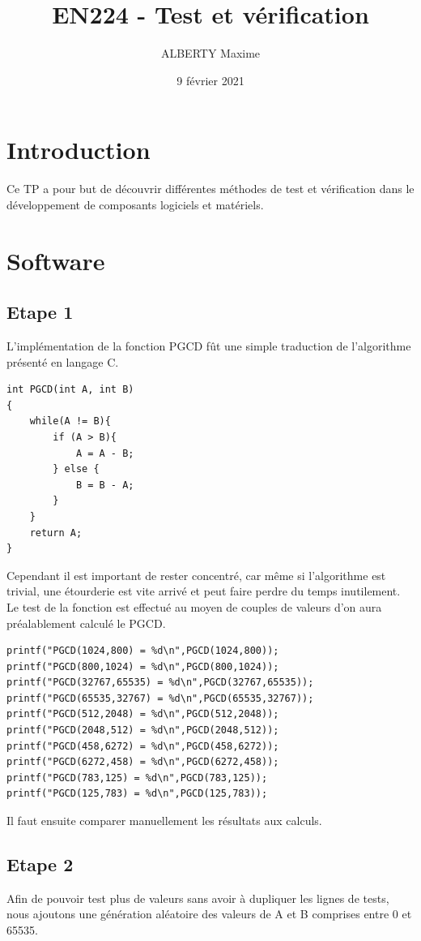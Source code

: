 \documentclass[a4paper]{article}
\title{EN224 - Test et vérification}
\author{ALBERTY Maxime}
\date{9 février 2021}
\begin{document}
\maketitle

\tableofcontents

\newpage %

\section{Introduction}
    Ce TP a pour but de découvrir différentes méthodes de test et vérification dans le développement de composants logiciels et matériels.
\section{Software}
    \subsection{Etape 1}
        L'implémentation de la fonction PGCD fût une simple traduction de l'algorithme présenté en langage C.
\begin{lstlisting}[style=CStyle]
int PGCD(int A, int B)
{
	while(A != B){
		if (A > B){
			A = A - B;
		} else {
			B = B - A;
		}
	}
	return A;
}
 \end{lstlisting}
        
        Cependant il est important de rester concentré, car même si l'algorithme est trivial, 
        une étourderie est vite arrivé et peut faire perdre du temps inutilement.
        \\
        
        Le test de la fonction est effectué au moyen de couples de valeurs d'on aura préalablement calculé le PGCD. 
\begin{lstlisting}[style=CStyle]
printf("PGCD(1024,800) = %d\n",PGCD(1024,800));
printf("PGCD(800,1024) = %d\n",PGCD(800,1024));
printf("PGCD(32767,65535) = %d\n",PGCD(32767,65535));
printf("PGCD(65535,32767) = %d\n",PGCD(65535,32767));
printf("PGCD(512,2048) = %d\n",PGCD(512,2048));
printf("PGCD(2048,512) = %d\n",PGCD(2048,512));
printf("PGCD(458,6272) = %d\n",PGCD(458,6272));
printf("PGCD(6272,458) = %d\n",PGCD(6272,458));
printf("PGCD(783,125) = %d\n",PGCD(783,125));
printf("PGCD(125,783) = %d\n",PGCD(125,783));
\end{lstlisting}
        Il faut ensuite comparer manuellement les résultats aux calculs.
        
        
    \subsection{Etape 2}
        Afin de pouvoir test plus de valeurs sans avoir à dupliquer les lignes de tests, 
        nous ajoutons une génération aléatoire des valeurs de A et B comprises entre 0 et 65535.
        
\end{document}
